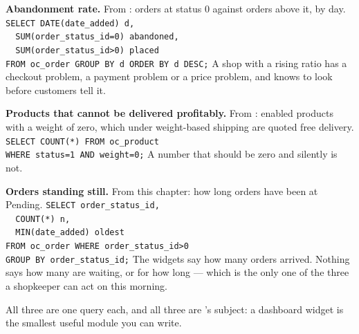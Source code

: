\begin{examplebox}
\begin{tightnum}
  \item \textbf{Abandonment rate.} From : orders at status 0
        against orders above it, by day.
        \smallskip
        \texttt{SELECT DATE(date\_added) d,}\\
        \texttt{\ \ SUM(order\_status\_id=0) abandoned,}\\
        \texttt{\ \ SUM(order\_status\_id>0) placed}\\
        \texttt{FROM oc\_order GROUP BY d ORDER BY d DESC;}
        \smallskip
        A shop with a rising ratio has a checkout problem, a payment problem or
        a price problem, and knows to look before customers tell it.
  \item \textbf{Products that cannot be delivered profitably.} From
        : enabled products with a weight of zero, which under
        weight-based shipping are quoted free delivery.
        \smallskip
        \texttt{SELECT COUNT(*) FROM oc\_product}\\
        \texttt{WHERE status=1 AND weight=0;}
        \smallskip
        A number that should be zero and silently is not.
  \item \textbf{Orders standing still.} From this chapter: how long orders have
        been at Pending.
        \smallskip
        \texttt{SELECT order\_status\_id,}\\
        \texttt{\ \ COUNT(*) n,}\\
        \texttt{\ \ MIN(date\_added) oldest}\\
        \texttt{FROM oc\_order WHERE order\_status\_id>0}\\
        \texttt{GROUP BY order\_status\_id;}
        \smallskip
        The widgets say how many orders arrived. Nothing says how many are
        waiting, or for how long --- which is the only one of the three a
        shopkeeper can act on this morning.
\end{tightnum}

\smallskip
All three are one query each, and all three are 's subject: a
dashboard widget is the smallest useful module you can write.
\end{examplebox}

